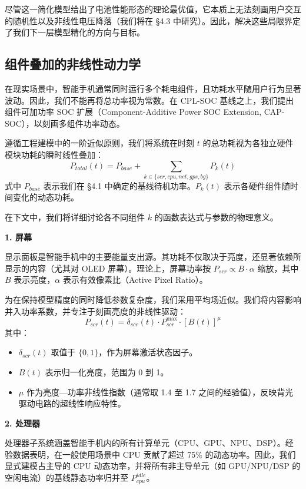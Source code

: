 \documentclass[11pt,a4paper]{ctexart}
\begin{document}
尽管这一简化模型给出了电池性能形态的理论最优值，它本质上无法刻画用户交互的随机性以及非线性电压降落（我们将在 §4.3 中研究）。因此，解决这些局限界定了我们下一层模型精化的方向与目标。

\subsection{组件叠加的非线性动力学}

在现实场景中，智能手机通常同时运行多个耗电组件，且功耗水平随用户行为显著波动。因此，我们不能再将总功率视为常数。在 CPL-SOC 基线之上，我们提出组件可加功率 SOC 扩展（Component-Additive Power SOC Extension, CAP-SOC），以刻画多组件功率动态。

遵循工程建模中的一阶近似原则，我们将系统在时刻 $t$ 的总功耗视为各独立硬件模块功耗的瞬时线性叠加：
\begin{equation}
P_{total}(t) = P_{base} + \sum_{k\in\{scr,cpu,net,gps,bg\}} P_k(t)
\end{equation}
式中 $P_{base}$ 表示我们在 §4.1 中确定的基线待机功率。$P_k(t)$ 表示各硬件组件随时间变化的动态功耗。

在下文中，我们将详细讨论各不同组件 $k$ 的函数表达式与参数的物理意义。

\noindent\textbf{1. 屏幕}

显示面板是智能手机中的主要能量支出源。其功耗不仅取决于亮度，还显著依赖所显示的内容（尤其对 OLED 屏幕）。理论上，屏幕功率按 $P_{scr}\propto B\cdot\alpha$ 缩放，其中 $B$ 表示亮度，$\alpha$ 表示有效像素比（Active Pixel Ratio）。

为在保持模型精度的同时降低参数复杂度，我们采用平均场近似。我们将内容影响并入功率系数，并专注于刻画亮度的非线性驱动：
\begin{equation}
P_{scr}(t) = \delta_{scr}(t)\cdot P_{scr}^{\max}\cdot [B(t)]^{\mu}
\end{equation}
其中：

\begin{itemize}[leftmargin=2em]
\item $\delta_{scr}(t)$ 取值于 $\{0,1\}$，作为屏幕激活状态因子。
\item $B(t)$ 表示归一化亮度，范围为 0 到 1。
\item $\mu$ 作为亮度—功率非线性指数（通常取 1.4 至 1.7 之间的经验值\cite{dong2011}），反映背光驱动电路的超线性响应特性。
\end{itemize}

\noindent\textbf{2. 处理器}

处理器子系统涵盖智能手机内的所有计算单元（CPU、GPU、NPU、DSP）。经验数据表明，在一般使用场景中 CPU 贡献了超过 75\% 的动态功率。因此，我们显式建模占主导的 CPU 动态功率，并将所有非主导单元（如 GPU/NPU/DSP 的空闲电流）的基线静态功率归并至 $P_{cpu}^{idle}$。
\end{document}

